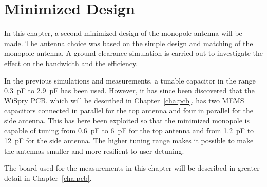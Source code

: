 \chapter{Minimized Design}
\label{cha_intro_5mm}
In this chapter, a second minimized design of the monopole antenna will be made.
The antenna choice was based on the simple design and matching of the monopole antenna.
A ground clearance simulation is carried out to investigate the effect on the bandwidth and the efficiency.

In the previous simulations and measurements, a tunable capacitor in the range \SI{0.3}{pF} to \SI{2.9}{pF} has been used. However, it has since been discovered that the WiSpry PCB, which will be described in Chapter~\ref{cha:pcb}, has two MEMS capacitors connected in parallel for the top antenna and four in parallel for the side antenna. This has here been exploited so that the minimized monopole is capable of tuning from \SI{0.6}{pF} to \SI{6}{pF} for the top antenna and from \SI{1.2}{pF} to \SI{12}{pF} for the side antenna. The higher tuning range makes it possible to make the antennas smaller and more resilient to user detuning.

The board used for the measurements in this chapter will be described in greater detail in Chapter~\ref{cha:pcb}.
